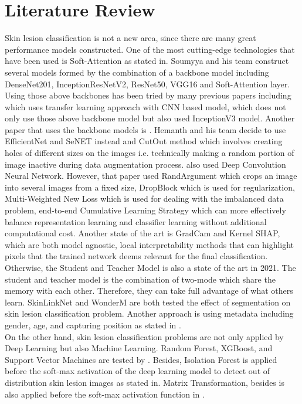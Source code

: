 \section{Literature Review}
Skin lesion classification is not a new area, since there are many great performance models constructed. One of the most cutting-edge technologies that have been used is Soft-Attention as stated in\cite{03358}. Soumyya and his team construct several models formed by the combination of a backbone model including DenseNet201\cite{06993}, InceptionResNetV2\cite{00567}, ResNet50\cite{03385}\cite{05027}, VGG16\cite{1556} and Soft-Attention layer. Using those above backbones has been tried by many previous papers including \cite{03798} which uses transfer learning approach with CNN based model, \cite{10348} which does not only use those above backbone model but also used InceptionV3\cite{00567} model. Another paper that uses the backbone models is \cite{09418}. Hemanth and his team decide to use EfficientNet\cite{11946} and SeNET\cite{01507} instead and CutOut\cite{04552v2} method which involves creating
holes of different sizes on the images i.e. technically making a random portion of image inactive during data augmentation process. \cite{01284} also used Deep Convolution Neural Network. However, that paper used RandArgument which crops an image into several images from a fixed size, DropBlock which is used for regularization, Multi-Weighted New Loss which is used for dealing with the imbalanced data problem, end-to-end Cumulative
Learning Strategy which can more effectively balance representation learning and
classifier learning without additional computational cost. Another state of the art is GradCam and Kernel SHAP\cite{06612}, which are both model agnostic, local interpretability methods that can highlight pixels that the trained network deems
relevant for the final classification.\\
Otherwise, the Student and Teacher Model is also a state of the art in 2021\cite{03225}. The student and teacher model is the combination of two-mode which share the memory with each other. Therefore, they can take full advantage of what others learn. SkinLinkNet\cite{12602} and WonderM\cite{03426} are both tested the effect of segmentation on skin lesion classification problem. Another approach is using metadata including gender, age, and capturing position as stated in \cite{03910}. \\
On the other hand, skin lesion classification problems are not only applied by Deep Learning but also Machine Learning. Random Forest, XGBoost, and Support Vector Machines are tested by \cite{03798}. Besides, Isolation Forest is applied before the soft-max activation of the deep learning model to detect out of distribution skin lesion images as stated in\cite{10348}. Matrix Transformation, besides is also applied before the soft-max activation function in \cite{05045}. 
